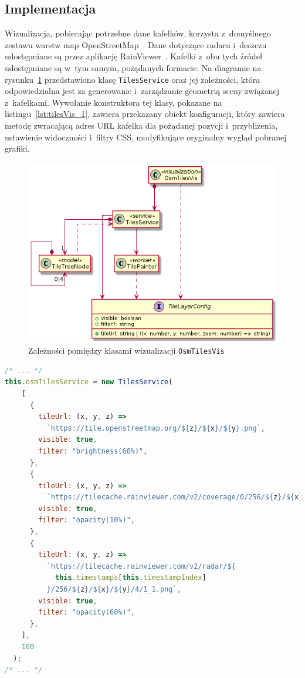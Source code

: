 \subsection{Implementacja}

Wizualizacja, pobierając potrzebne dane kafelków, korzysta z~domyślnego zestawu warstw map OpenStreetMap~\cite{OSM}. Dane dotyczące radaru i~deszczu udostępniane są przez aplikację RainViewer~\cite{RainViewer}. Kafelki z~obu tych źródeł udostępniane są w~tym samym, pożądanych formacie. Na diagramie na rysunku~\ref{fig:c4_tiles} przedstawiono klasę \texttt{TilesService} oraz jej zależności, która odpowiedzialna jest za generowanie i~zarządzanie geometrią sceny związanej z~kafelkami. Wywołanie konstruktora tej klasy, pokazane na listingu~\ref{lst:tilesVis_1}, zawiera przekazany obiekt konfiguracji, który zawiera metodę zwracającą adres URL kafelka dla pożądanej pozycji i~przybliżenia, ustawienie widoczności i~filtry CSS, modyfikujące oryginalny wygląd pobranej grafiki.

\begin{figure}[h]
  \centering
  \includegraphics[scale=0.7]{diagrams/out/c4_tiles.png}
  \caption{Zależności pomiędzy klasami wizualizacji \texttt{OsmTilesVis}}
  \label{fig:c4_tiles} 
\end{figure}

\begin{lstlisting}[float=h, language=javascript, label={lst:tilesVis_1}, caption={
  Fragmenty klasy \texttt{OsmTilesVis}}
]
/* ... */
this.osmTilesService = new TilesService(
    [
      {
        tileUrl: (x, y, z) =>
          `https://tile.openstreetmap.org/${z}/${x}/${y}.png`,
        visible: true,
        filter: "brightness(60%)",
      },
      {
        tileUrl: (x, y, z) =>
          `https://tilecache.rainviewer.com/v2/coverage/0/256/${z}/${x}/${y}.png`,
        visible: true,
        filter: "opacity(10%)",
      },
      {
        tileUrl: (x, y, z) =>
          `https://tilecache.rainviewer.com/v2/radar/${
            this.timestamps[this.timestampIndex]
          }/256/${z}/${x}/${y}/4/1_1.png`,
        visible: true,
        filter: "opacity(60%)",
      },
    ],
    100
  );
/* ... */
\end{lstlisting}

